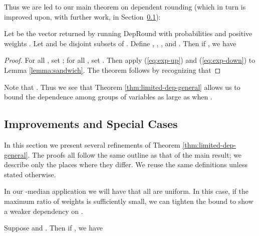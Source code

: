 Thus we are led to our main theorem on dependent rounding (which in turn is improved upon, with further work, in Section~\ref{sec:dep-round-special}): 

\begin{theorem}\label{thm:limited-dep-general}
Let  be the vector returned by running {\sc DepRound} with probabilities  and positive weights . Let  and  be disjoint subsets of . Define , , , and . Then if , we have

\end{theorem}
\begin{proof}
For all , set ; for all , set . Then apply (\ref{eq:exp-up}) and (\ref{eq:exp-down}) to Lemma \ref{lemma:sandwich}. The theorem follows by recognizing that

\end{proof}
Note that . Thus we see that Theorem \ref{thm:limited-dep-general} allows us to bound the dependence among groups of variables as large as  when .
\subsection{Improvements and Special Cases}
\label{sec:dep-round-special}
In this section we present several refinements of Theorem \ref{thm:limited-dep-general}. The proofs all follow the same outline as that of the main result; we describe only the places where they differ.  We reuse the same definitions unless stated otherwise.

In our -median application we will have that all  are uniform. In this case, if the maximum ratio of weights is sufficiently small, we can tighten the bound to show a weaker dependency on .
\begin{theorem}\label{cor:dep-uniform-p}
Suppose  and . Then if , we have  

\end{theorem}

